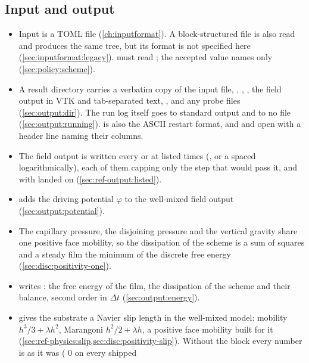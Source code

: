 \subsection*{Input and output}

\begin{itemize}
  \item Input is a TOML file (\cref{ch:inputformat}). A block-structured 
    file is also read and produces the same tree, but its format is not
    specified here (\cref{sec:inputformat:legacy}).  must read
    ; the accepted value names  only
    (\cref{sec:policy:scheme}).
  \item A result directory carries a verbatim copy of the input file,
    , , , the field
    output in VTK and tab-separated text, ,
     and any probe files (\cref{sec:output:dir}). The run
    log itself goes to standard output and to no file
    (\cref{sec:output:running}).  is also the ASCII restart
    format, and  and  open with a header
    line naming their columns.
  \item The field output is written every  or at listed
    times (, or a  spaced logarithmically), each
    of them capping only the step that would pass it, and with
     landed on (\cref{sec:ref-output:listed}).
  \item {} adds the driving potential $\varphi$ to the
    well-mixed field output (\cref{sec:output:potential}).
  \item The capillary pressure, the disjoining pressure and the vertical
    gravity share one positive face mobility, so the dissipation of the
    scheme is a sum of squares and a steady film the minimum of the discrete
    free energy (\cref{sec:disc:positivity-one}).
  \item {} writes : the free energy of the
    film, the dissipation of the scheme and their balance, second order in
    $\Delta t$ (\cref{sec:output:energy}).
  \item {} gives the substrate a Navier slip length in the
    well-mixed model: mobility $h^3/3 + \lambda h^2$, Marangoni
    $h^2/2 + \lambda h$, a positive face mobility built for it
    (\cref{sec:ref-physics:slip,sec:disc:positivity-slip}). Without the
    block every number is as it was ( 0 on every shipped

\end{itemize}
